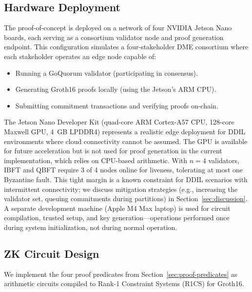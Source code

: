 \subsection{Hardware Deployment}
\label{sec:arch-hardware}

The proof-of-concept is deployed on a network of four NVIDIA Jetson Nano boards, each serving as a consortium validator node and proof generation endpoint.
This configuration simulates a four-stakeholder DME consortium where each stakeholder operates an edge node capable of:
\begin{itemize}
    \item Running a GoQuorum validator (participating in consensus).
    \item Generating Groth16 proofs locally (using the Jetson's ARM CPU).
    \item Submitting commitment transactions and verifying proofs on-chain.
\end{itemize}

The Jetson Nano Developer Kit (quad-core ARM Cortex-A57 CPU, 128-core Maxwell GPU, 4~GB LPDDR4) represents a realistic edge deployment for DDIL environments where cloud connectivity cannot be assumed.
The GPU is available for future acceleration but is not used for proof generation in the current implementation, which relies on CPU-based arithmetic.
With $n=4$ validators, IBFT and QBFT require 3 of 4 nodes online for liveness, tolerating at most one Byzantine fault.
This tight margin is a known constraint for DDIL scenarios with intermittent connectivity; we discuss mitigation strategies (e.g., increasing the validator set, queuing commitments during partitions) in Section~\ref{sec:discussion}.
A separate development machine (Apple M4 Max laptop) is used for circuit compilation, trusted setup, and key generation---operations performed once during system initialization, not during normal operation.

\subsection{ZK Circuit Design}
\label{sec:arch-zk}

We implement the four proof predicates from Section~\ref{sec:proof-predicates} as arithmetic circuits compiled to Rank-1 Constraint Systems (R1CS) for Groth16.

